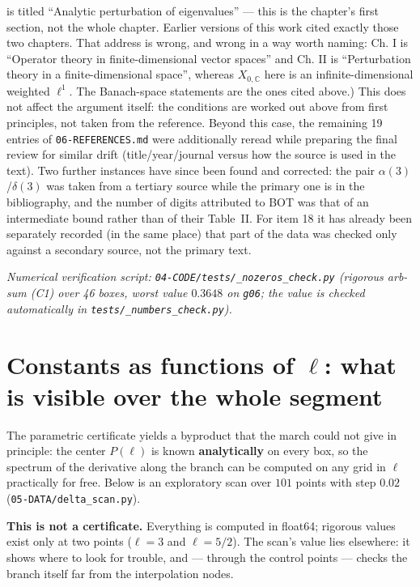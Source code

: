 \begin{itemize}
  is titled ``Analytic perturbation of eigenvalues'' --- this is the chapter's
  first section, not the whole chapter. Earlier versions of this work cited
  exactly those two chapters. That address is wrong, and wrong in a way
  worth naming: Ch. I is ``Operator theory in finite-dimensional vector
  spaces'' and Ch. II is ``Perturbation theory in a finite-dimensional
  space'', whereas $X_{0,\mathbb C}$ here is an infinite-dimensional weighted
  $\ell^1$. The Banach-space statements are the ones cited above.) This does
  not affect the argument itself: the conditions are worked out above from first principles, not
  taken from the reference. Beyond this case, the remaining 19 entries of
  \texttt{06-\allowbreak REFERENCES.md} were additionally reread while preparing the final
  review for similar drift (title/year/journal versus how the source is
  used in the text). Two further instances have since been found and
  corrected: the pair $\alpha(3)$/$\delta(3)$ was taken from a tertiary
  source while the primary one is in the bibliography, and the number of
  digits attributed to BOT was that of an intermediate bound rather than of
  their Table~II. For item 18 it has
  already been separately recorded (in the same place) that part of the
  data was checked only against a secondary source, not the primary text.
\end{itemize}

\emph{Numerical verification script: \texttt{04-\allowbreak CODE/\allowbreak tests/\allowbreak \_\allowbreak nozeros\_\allowbreak check.py} (rigorous
arb-sum (C1) over 46 boxes, worst value $0.3648$ on \texttt{g06}; the value is
checked automatically in \texttt{tests/\allowbreak \_\allowbreak numbers\_\allowbreak check.py}).}



\section{Constants as functions of $\ell$: what is visible over the whole segment}
\label{sec:7}

The parametric certificate yields a byproduct that the march could not give
in principle: the center $P(\ell)$ is known \textbf{analytically} on every box, so the
spectrum of the derivative along the branch can be computed on any grid in $\ell$
practically for free. Below is an exploratory scan over $101$ points with step
$0.02$ (\texttt{05-\allowbreak DATA/\allowbreak delta\_\allowbreak scan.py}).

\textbf{This is not a certificate.} Everything is computed in float64; rigorous
values exist only at two points ($\ell=3$ and $\ell=5/2$). The scan's value lies
elsewhere: it shows where to look for trouble, and --- through the control
points --- checks the branch itself far from the interpolation nodes.


